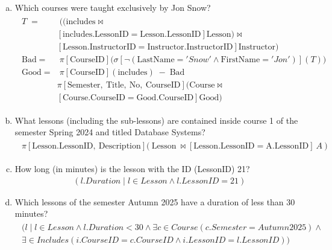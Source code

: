 \documentclass{article}
\begin{document}
\begin{enumerate}[(a)]
\item
Which courses were taught exclusively by Jon Snow?
\begin{align}
    \begin{split}
T \;=&\; ((\text{includes} \Join \\[-1pt]
&\left[\text{includes.LessonID}=\text{Lesson.LessonID}\right] \text{Lesson}) \Join \\[-1pt]
&\left[\text{Lesson.InstructorID}=\text{Instructor.InstructorID}\right] \text{Instructor})\\[4pt]
\text{Bad} \;=&\; \pi\left[\text{CourseID}\right]\big(\sigma\left[\neg(\text{LastName}='Snow' \land \text{FirstName}='Jon')\right](T)\big)\\[4pt]
\text{Good} \;=&\; \pi\left[\text{CourseID}\right](\text{includes})\;-\;\text{Bad}\\[4pt]
&\pi\left[\text{Semester},\ \text{Title},\ \text{No},\ \text{CourseID}\right]
\big(\text{Course} \Join \\[-1pt]
&\left[\text{Course.CourseID}=\text{Good.CourseID}\right] \text{Good}\big)
    \end{split}
\end{align}



\item 
What lessons (including the sub-lessons) are contained inside course 1 of the semester Spring 2024 and titled Database Systems?
\begin{align}
    \begin{split}
\pi\left[\text{Lesson.LessonID},\ \text{Description}\right]
\Big(\ \text{Lesson}\ \Join
\left[\text{Lesson.LessonID}=\text{A.LessonID}\right]\ A\ \Big)
    \end{split}
\end{align}


\item How long (in minutes) is the lesson with the ID (LessonID) 21?
\begin{align}
    (l.Duration \mid l \in Lesson \wedge l.LessonID = 21)
\end{align}

\item Which lessons of the semester Autumn 2025 have a duration of less than 30 minutes?
\begin{align}
    \begin{split}
   (l \mid l \in Lesson \wedge l.Duration < 30 \wedge \exists c \in Course (c.Semester = Autumn 2025)\wedge \\ 
   \exists\in Includes(i.CourseID=c.CourseID\wedge i.LessonID = l.LessonID))
    \end{split}
\end{align}


\end{enumerate}
\end{document}

